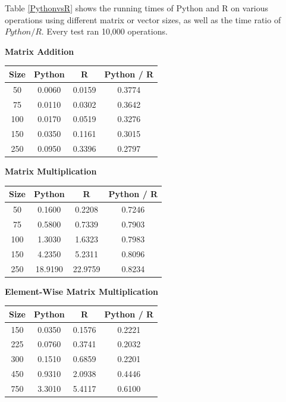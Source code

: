 \documentclass[%
  final,
  notitlepage,
  narroweqnarray,
  inline,
]{ieee}
\begin{document}
Table \ref{PythonvsR} shows the running times of Python and R on various
operations using different matrix or vector sizes, as well as the time ratio of
$Python / R$. Every test ran 10,000 operations.

\begin{table}[h!]
  \begin{center}
    \vspace{1em}
    \textbf{Matrix Addition} \\
    \begin{tabular}{cccc}
      Size  & Python  &  R      & Python / R \\
      \hline
      50  & 0.0060 & 0.0159 & 0.3774 \\
      75  & 0.0110 & 0.0302 & 0.3642 \\
      100 & 0.0170 & 0.0519 & 0.3276 \\
      150 & 0.0350 & 0.1161 & 0.3015 \\
      250 & 0.0950 & 0.3396 & 0.2797 \\
    \end{tabular}

    \vspace{1em}
    \textbf{Matrix Multiplication} \\
    \begin{tabular}{cccc}
      Size  & Python  &  R    & Python / R \\
      \hline
      50  & 0.1600  & 0.2208  & 0.7246 \\
      75  & 0.5800  & 0.7339  & 0.7903 \\
      100 & 1.3030  & 1.6323  & 0.7983 \\
      150 & 4.2350  & 5.2311  & 0.8096 \\
      250 & 18.9190 & 22.9759 & 0.8234 \\
    \end{tabular}

    \vspace{1em}
    \textbf{Element-Wise Matrix Multiplication} \\
    \begin{tabular}{cccc}
      Size  & Python  &  R       & Python / R \\
      \hline
      150   & 0.0350  &  0.1576  &  0.2221 \\
      225   & 0.0760  &  0.3741  &  0.2032 \\
      300   & 0.1510  &  0.6859  &  0.2201 \\
      450   & 0.9310  &  2.0938  &  0.4446 \\
      750   & 3.3010  &  5.4117  &  0.6100 \\
    \end{tabular}


\end{center}
\end{table}
\end{document}
